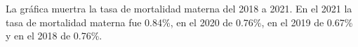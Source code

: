 La gráfica muertra la tasa de mortalidad materna del 2018 a 2021. En el 2021 la tasa de mortalidad materna fue 0.84\%, en el 2020 de 0.76\%, en el 2019 de 0.67\% y en el 2018 de 0.76\%. 
